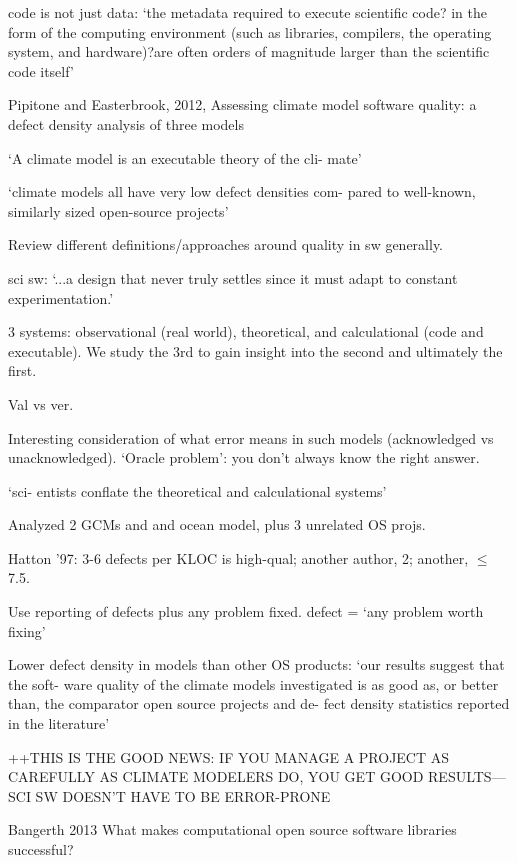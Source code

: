 \documentclass[12pt]{amsart}
\begin{document}
code is not just data: `the metadata required to execute scientific code? in the form of the computing environment (such as libraries, compilers, the operating system, and hardware)?are often orders of magnitude larger than the scientific code itself'



Pipitone and Easterbrook, 2012, Assessing climate model software quality: a defect density analysis of three models

`A climate model is an executable theory of the cli- mate'

`climate models all have very low defect densities com- pared to well-known, similarly sized open-source projects'

Review different definitions/approaches around quality in sw generally.

sci sw: `...a design that never truly settles since it must adapt to constant experimentation.'

3 systems: observational (real world), theoretical, and calculational (code and executable). We study the 3rd to gain insight into the second and ultimately the first.

Val vs ver. 

Interesting consideration of what error means in such models (acknowledged vs unacknowledged). `Oracle problem': you don't always know the right answer.

`sci- entists conflate the theoretical and calculational systems'

Analyzed 2 GCMs and and ocean model, plus 3 unrelated OS projs.

Hatton '97: 3-6 defects per KLOC is high-qual; another author, 2; another, $\le$7.5.

Use reporting of defects plus any problem fixed. defect = `any problem worth fixing'

Lower defect density in models than other OS products: `our results suggest that the soft- ware quality of the climate models investigated is as good as, or better than, the comparator open source projects and de- fect density statistics reported in the literature'

++THIS IS THE GOOD NEWS: IF YOU MANAGE A PROJECT AS CAREFULLY AS CLIMATE MODELERS DO, YOU GET GOOD RESULTS---SCI SW DOESN'T HAVE TO BE ERROR-PRONE





Bangerth 2013 What makes computational open source software libraries successful?
\end{document}
